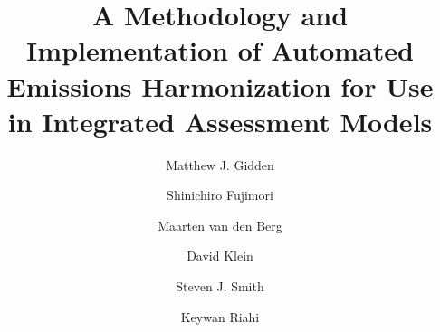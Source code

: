 \begin{frontmatter}

\title{A Methodology and Implementation of Automated Emissions Harmonization for Use in Integrated Assessment Models}

\author[iiasa]{Matthew J. Gidden}

\author[nies]{Shinichiro Fujimori}
\author[pbl]{Maarten van den Berg}
\author[pik]{David Klein}
\author[pnnl]{Steven J. Smith}
\author[iiasa]{Keywan Riahi}

\address[iiasa]{International Institute for Applied Systems Analysis,
  Schlossplatz 1, A-2361 Laxenburg, Austria}
\address[nies]{National Institute for Environmental Studies, Tsukuba, Japan}
\address[pbl]{PBL Netherlands Environmental Assessment Agency, Postbus 30314, 2500 GH The Hague, Netherlands}
\address[pik]{Potsdam Institute for Climate Impact Research (PIK), Member of the Leibniz Association, P.O. Box 60 12 03, D-14412 Potsdam, Germany}
\address[pnnl]{Joint Global Change Research Institute, 5825 University Research Court, Suite 3500, College Park, MD 20740}


\end{frontmatter}
